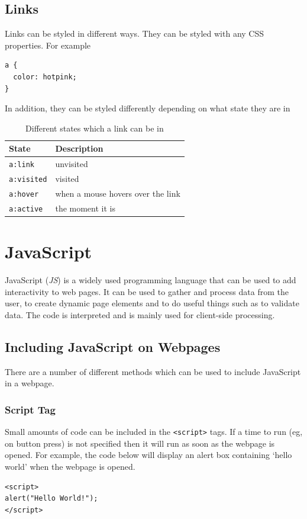 \documentclass{thomasClass}
\begin{document}
\section{Links}
Links can be styled in different ways. They can be styled with any CSS properties. For example
\begin{Verbatim}[breaklines=true, breakanywhere=true]
a {
  color: hotpink;
}
\end{Verbatim}
In addition, they can be styled differently depending on what state they are in
\begin{table}[H]
    \centering
    \begin{tabularx}{0.5\textwidth}{X|X}
        State & Description\\
        \hline
        \verb|a:link| & unvisited\\
        \verb|a:visited| & visited\\
        \verb|a:hover| & when a mouse hovers over the link\\
        \verb|a:active| & the moment it is 
    \end{tabularx}
    \caption{Different states which a link can be in}
    \label{tab:linkStates}
\end{table}

\chapter{JavaScript}
JavaScript (\textit{JS}) is a widely used programming language that can be used to add interactivity to web pages. It can be used to gather and process data from the user, to create dynamic page elements and to do useful things such as to validate data. The code is interpreted and is mainly used for client-side processing.
\section{Including JavaScript on Webpages}
There are a number of different methods which can be used to include JavaScript in a webpage. 
\subsection{Script Tag}
Small amounts of code can be included in the \verb|<script>| tags. If a time to run (eg, on button press) is not specified then it will run as soon as the webpage is opened. For example, the code below will display an alert box containing ‘hello world’ when the webpage is opened.
\begin{Verbatim}[breaklines=true, breakanywhere=true]
<script>
alert("Hello World!");
</script>
\end{Verbatim}
\end{document}
